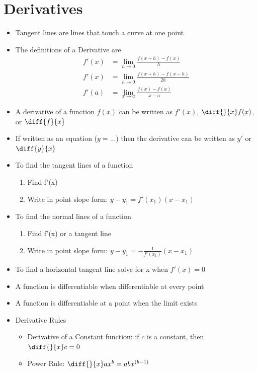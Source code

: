 \documentclass{article}
\begin{document}
\newpage
\section{Derivatives}
\begin{itemize}
    \item Tangent lines are lines that touch a curve at one point
    \item The definitions of a Derivative are
    \begin{align*}
        f'(x) &= \lim_{h\to 0} \frac{f(x+h) - f(x)}{h} \\
        f'(x) &= \lim_{h\to 0} \frac{f(x+h) - f(x-h)}{2h} \\
        f'(a) &= \lim_{x\to a} \frac{f(x) - f(a)}{x-a}
    \end{align*}
    
    \item A derivative of a function $f(x)$ can be written as $f'(x)$, $\diff{}{x} f(x)$, or $\diff{f}{x}$
    \item If written as an equation ($y=$...) then the derivative can be written as $y'$ or $\diff{y}{x}$
    \item To find the tangent lines of a function
    \begin{enumerate}
        \item Find f'(x)
        \item Write in point slope form: $y - y_1 = f'(x_1)(x - x_1)$
    \end{enumerate}
    \item To find the normal lines of a function
    \begin{enumerate}
        \item Find f'(x) or a tangent line
        \item Write in point slope form: $y - y_1 = -\frac{1}{f'(x_1)}(x - x_1)$
    \end{enumerate}
    \item To find a horizontal tangent line solve for x when $f'(x) = 0$
    \item A function is differentiable when differentiable at every point
    \item A function is differentiable at a point when the limit exists 
    \item Derivative Rules
    \begin{itemize}
        \item Derivative of a Constant function: if $c$ is a constant, then $\diff{}{x} c = 0$
        \item Power Rule: $\diff{}{x} ax^b = abx^{(b-1)}$

\end{itemize}
\end{itemize}
\end{document}
